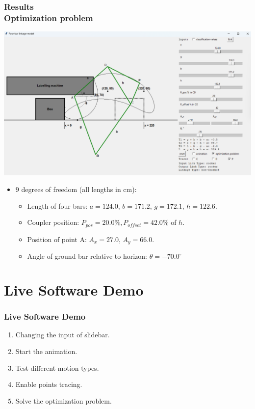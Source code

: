 \documentclass[ucs,10pt]{beamer}
\begin{document}
\begin{frame}
\frametitle{Results \\
	\small \color{rwth-blue} Optimization problem}
	\begin{center}
		\includegraphics[width=0.8\linewidth]{./Figures/optimization_problem_solution.png}
	\end{center}
	\begin{itemize}
		\item 9 degrees of freedom (all lengths in cm):
		\begin{itemize}
			\item Length of four bars: $a = 124.0$, $b = 171.2$, $g = 172.1$, $h = 122.6$.
			\item Coupler position: $P_{pos} = 20.0 \%, P_{offset} = 42.0 \%$ of $h$.
			\item Position of point A: $A_x = 27.0$, $A_y = 66.0$.
			\item Angle of ground bar relative to horizon: $\theta = -70.0^{\circ}$
		\end{itemize}
	\end{itemize}
\end{frame}

\section{Live Software Demo}

\begin{frame}
\frametitle{Live Software Demo}

\begin{enumerate}
	\item Changing the input of slidebar.
	\item Start the animation.
	\item Test different motion types.
	\item Enable points tracing.
	\item Solve the optimization problem.
\end{enumerate}

\end{frame}
\end{document}
